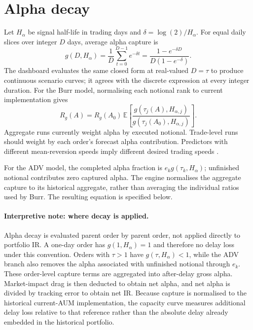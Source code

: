 \documentclass[11pt,a4paper]{article}
\numberwithin{equation}{section}
\begin{document}
\section{Alpha decay}
Let $H_\alpha$ be signal half-life in trading days and $\delta=\log(2)/H_\alpha$. For equal daily
slices over integer $D$ days, average alpha capture is
\begin{equation}\label{eq:capture}
 g(D,H_\alpha)=\frac{1}{D}\sum_{t=0}^{D-1}e^{-\delta t}
 =\frac{1-e^{-\delta D}}{D(1-e^{-\delta})}.
\end{equation}
The dashboard evaluates the same closed form at real-valued $D=\tau$ to produce continuous
scenario curves; it agrees with the discrete expression at every integer duration.
For the Burr model, normalising each notional rank to current implementation gives
\begin{equation}\label{eq:gross}
 R_g(A)=R_g(A_0)\,
 \mathbb{E}\left[\frac{g(\tau_j(A),H_{\alpha,j})}
 {g(\tau_j(A_0),H_{\alpha,j})}\right].
\end{equation}
Aggregate runs currently weight alpha by executed notional. Trade-level runs should weight by each
order's forecast alpha contribution. Predictors with different mean-reversion speeds imply
different desired trading speeds \cite{garleanu2013}.


For the ADV model, the completed alpha fraction is $e_k g(\tau_k,H_\alpha)$; unfinished notional
contributes zero captured alpha. The engine normalises the aggregate capture to its historical
aggregate, rather than averaging the individual ratios used by Burr. The resulting equation is
specified below.

\paragraph{Interpretive note: where decay is applied.}
Alpha decay is evaluated parent order by parent order, not applied directly to portfolio IR.
A one-day order has $g(1,H_\alpha)=1$ and therefore no delay loss under this convention.
Orders with $\tau>1$ have $g(\tau,H_\alpha)<1$, while the ADV branch also removes the alpha associated
with unfinished notional through $e_k$. These order-level capture terms are aggregated into
after-delay gross alpha. Market-impact drag is then deducted to obtain net alpha, and net alpha
is divided by tracking error to obtain net IR. Because capture is normalised to the historical
current-AUM implementation, the capacity curve measures additional delay loss relative to that
reference rather than the absolute delay already embedded in the historical portfolio.
\end{document}
